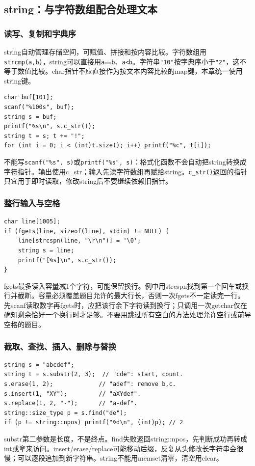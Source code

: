 \subsection{string：与字符数组配合处理文本}
\subsubsection{读写、复制和字典序}
string自动管理存储空间，可赋值、拼接和按内容比较。字符数组用\texttt{strcmp(a,b)}，string可以直接用\texttt{a==b}、\texttt{a<b}。字符串\texttt{"10"}按字典序小于\texttt{"2"}，这不等于数值比较。char指针不应直接作为按文本内容比较的map键，本章统一使用string键。
\begin{lstlisting}
char buf[101];
scanf("%100s", buf);
string s = buf;
printf("%s\n", s.c_str());
string t = s; t += "!";
for (int i = 0; i < (int)t.size(); i++) printf("%c", t[i]);
\end{lstlisting}
不能写\texttt{scanf("\%s", s)}或\texttt{printf("\%s", s)}：格式化函数不会自动把string转换成字符指针。输出使用c\_str；输入先读字符数组再赋给string。\texttt{c\_str()}返回的指针只宜用于即时读取，修改string后不要继续依赖旧指针。

\subsubsection{整行输入与空格}
\begin{lstlisting}
char line[1005];
if (fgets(line, sizeof(line), stdin) != NULL) {
    line[strcspn(line, "\r\n")] = '\0';
    string s = line;
    printf("[%s]\n", s.c_str());
}
\end{lstlisting}
fgets最多读入容量减1个字符，可能保留换行。例中用strcspn找到第一个回车或换行并截断。容量必须覆盖题目允许的最大行长，否则一次fgets不一定读完一行。先scanf读取数字再fgets时，应把该行余下字符读到换行；只调用一次getchar仅在确知剩余恰好一个换行时才足够。不要用跳过所有空白的方法处理允许空行或前导空格的题目。

\subsubsection{截取、查找、插入、删除与替换}
\begin{lstlisting}
string s = "abcdef";
string t = s.substr(2, 3);  // "cde": start, count.
s.erase(1, 2);             // "adef": remove b,c.
s.insert(1, "XY");         // "aXYdef".
s.replace(1, 2, "-");      // "a-def".
string::size_type p = s.find("de");
if (p != string::npos) printf("%d\n", (int)p); // 2
\end{lstlisting}
substr第二参数是长度，不是终点。find失败返回string::npos，先判断成功再转成int或拿来访问。insert/erase/replace可能移动后缀，反复从头修改长字符串会很慢；可以逐段追加到新字符串。string不能用memset清零，清空用clear。

